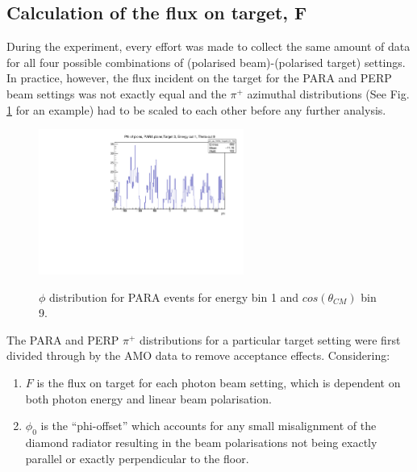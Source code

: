 \subsection{Calculation of the flux on target, F} \label{ch:flux}
During the experiment, every effort was made to collect the same amount of data for all four possible combinations of (polarised beam)-(polarised target) settings. In practice, however, the flux incident on the target for the PARA and PERP beam settings was not exactly equal and the $\pi^+$ azimuthal distributions (See Fig. \ref{fig:frost_PARA_ex} for an example) had to be scaled to each other before any further analysis.
\begin{figure}[H]
  \begin{center}
    \includegraphics[width=0.6\textwidth]{figures/phi_PARA.pdf} \\
    \caption{$\phi$ distribution for PARA events for energy bin 1 and $cos(\theta_{CM})$ bin 9. }
    \label{fig:frost_PARA_ex}
  \end{center}
\end{figure}



The PARA and PERP $\pi^+$ distributions for a particular target setting were first divided through by the AMO data to remove acceptance effects.
Considering:
\begin{enumerate}
  \item $F$ is the flux on target for each photon beam setting, which is dependent on both photon energy and linear beam polarisation. 
  \item $\phi_0$ is the “phi-offset” which accounts for any small misalignment of the diamond radiator resulting in the beam polarisations not being exactly parallel or exactly perpendicular to the floor.
\end{enumerate}

